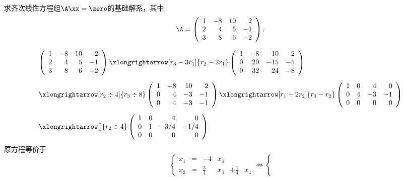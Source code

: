 \begin{li}
  求齐次线性方程组$\A\xx=\zero$的基础解系，其中
  $$
  \A = \left(
    \begin{array}{rrrr}
      1&-8&10&2\\
      2&4&5&-1\\
      3&8&6&-2
    \end{array}
  \right).
  $$
\end{li}
\begin{jie}
$$
\begin{array}{l}
  \left(
  \begin{array}{rrrr}
    1&-8&10&2\\
    2&4&5&-1\\
    3&8&6&-2
  \end{array}
           \right) \xlongrightarrow[r_3-3r_1]{r_2-2r_1}
           \left(
           \begin{array}{rrrr}
             1&-8&10&2\\
             0&20&-15&-5\\
             0&32&24&-8
           \end{array}
                      \right)\\[0.3in]
  \xlongrightarrow[r_2\div4]{r_3\div8}
  \left(
  \begin{array}{rrrr}
    1&-8&10&2\\
    0&4&-3&-1\\
    0&4&-3&-1
  \end{array}
            \right) \xlongrightarrow[r_1+2r_2]{r_3-r_2}
            \left(
            \begin{array}{rrrr}
              1&0&4&0\\
              0&4&-3&-1\\
              0&0&0&0
            \end{array}
                     \right) \\[0.3in]
  \xlongrightarrow[]{r_2\div4}
  \left(
  \begin{array}{rrrr}
    1&0&4&0\\
    0&1&-3/4&-1/4\\
    0&0&0&0
  \end{array}
           \right)
\end{array}
$$
原方程等价于
$$\left\{
  \begin{array}{rcrcrc}
    x_1&=&-4&x_3&&\\[0.1in]
    x_2&=&\frac34&x_3&+\frac14&x_4
  \end{array}
\right.  \Leftrightarrow
\left\{
$$
\end{jie}
